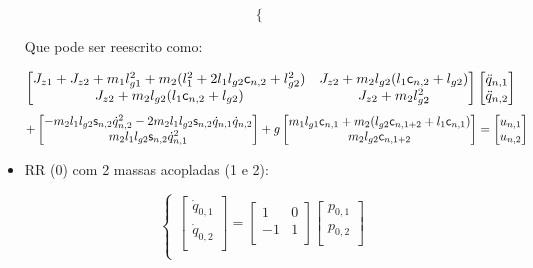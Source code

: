 \begin{itemize}
\begin{equation}
\begin{cases}
\end{cases}
\end{equation}

Que pode ser reescrito como:

$$
\begin{bmatrix}
J_{z1} + J_{z2} + m_1 l_{g1}^2 + m_2 (l_1^2 + 2 l_1 l_{g2} \mathsf{c}_{n,2} + l_{g2}^2) & J_{z2} + m_2 l_{g2} (l_1 \mathsf{c}_{n,2} + l_{g2}) \\
J_{z2} + m_2 l_{g2} (l_1 \mathsf{c}_{n,2} + l_{g2}) & J_{z2} + m_2 l_{g2}^2
\end{bmatrix}
\begin{bmatrix}
\ddot{q}_{n,1} \\
\ddot{q}_{n,2} \\
\end{bmatrix}
$$
$$
+
\begin{bmatrix}
- m_2 l_1 l_{g2} \mathsf{s}_{n,2} \dot{q}_{n,2}^2 -2 m_2 l_1 l_{g2} \mathsf{s}_{n,2} \dot{q}_{n,1}  \dot{q} _{n,2} \\
m_2 l_1 l_{g2} \mathsf{s}_{n,2} \dot{q}_{n,1}^2 \\
\end{bmatrix}
+
g \begin{bmatrix}
m_1 l_{g1} \mathsf{c}_{n,1} + m_2 (l_{g2} \mathsf{c}_{n,1+2} + l_1 \mathsf{c}_{n,1}) \\
 m_2 l_{g2} \mathsf{c}_{n,1+2} \\
\end{bmatrix}
=
\begin{bmatrix}
u_{n,1} \\
u_{n,2} \\
\end{bmatrix}
$$

\item RR (0) com 2 massas acopladas (1 e 2):

\begin{equation}
\begin{cases}

\begin{bmatrix}
\dot{q}_{0,1} \\
\dot{q}_{0,2} \\
\end{bmatrix}
=
\begin{bmatrix}
1 & 0 \\
-1 & 1\\
\end{bmatrix}
\begin{bmatrix}
p_{0,1} \\
p_{0,2} \\
\end{bmatrix} \\


\end{cases}
\end{equation}
\end{itemize}
